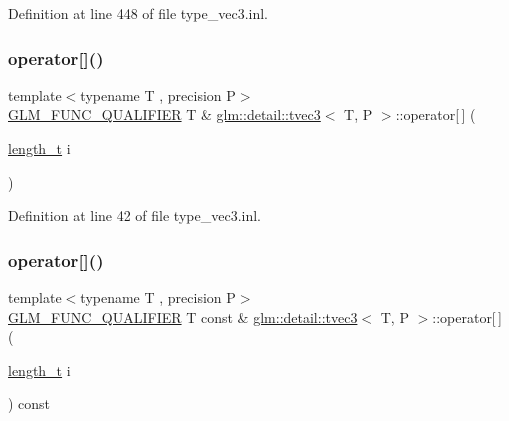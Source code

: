 Definition at line 448 of file type\+\_\+vec3.\+inl.

\mbox{\label{structglm_1_1detail_1_1tvec3_a45e7f76041f4836b8855395fb8c6e244}} 
\subsubsection{\texorpdfstring{operator[]()}{operator[]()}\hspace{0.1cm}{\footnotesize\ttfamily [1/2]}}
{\footnotesize\ttfamily template$<$typename T , precision P$>$ \\
\hyperlink{setup_8hpp_a33fdea6f91c5f834105f7415e2a64407}{G\+L\+M\+\_\+\+F\+U\+N\+C\+\_\+\+Q\+U\+A\+L\+I\+F\+I\+ER} T \& \hyperlink{structglm_1_1detail_1_1tvec3}{glm\+::detail\+::tvec3}$<$ T, P $>$\+::operator\mbox{[}$\,$\mbox{]} (\begin{DoxyParamCaption}\item[{\hyperlink{namespaceglm_a090a0de2260835bee80e71a702492ed9}{length\+\_\+t}}]{i }\end{DoxyParamCaption})}



Definition at line 42 of file type\+\_\+vec3.\+inl.

\mbox{\label{structglm_1_1detail_1_1tvec3_a4e150d5265e619688a7276366a7415e1}} 
\subsubsection{\texorpdfstring{operator[]()}{operator[]()}\hspace{0.1cm}{\footnotesize\ttfamily [2/2]}}
{\footnotesize\ttfamily template$<$typename T , precision P$>$ \\
\hyperlink{setup_8hpp_a33fdea6f91c5f834105f7415e2a64407}{G\+L\+M\+\_\+\+F\+U\+N\+C\+\_\+\+Q\+U\+A\+L\+I\+F\+I\+ER} T const  \& \hyperlink{structglm_1_1detail_1_1tvec3}{glm\+::detail\+::tvec3}$<$ T, P $>$\+::operator\mbox{[}$\,$\mbox{]} (\begin{DoxyParamCaption}\item[{\hyperlink{namespaceglm_a090a0de2260835bee80e71a702492ed9}{length\+\_\+t}}]{i }\end{DoxyParamCaption}) const}



